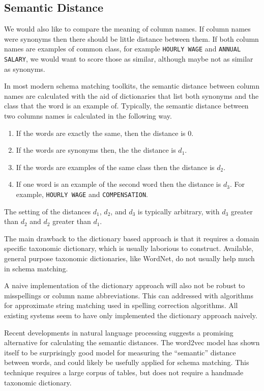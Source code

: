 \documentclass{datamade}
\theoremstyle{definition}
\theoremstyle{remark}
\begin{document}
\subsection{Semantic Distance}
We would also like to compare the meaning of column names. If column names
were synonyms then there should be little distance between
them. If both column names are examples of common class, for example
\verb+HOURLY WAGE+ and \verb+ANNUAL SALARY+, we would want to score
those as similar, although maybe not as similar as synonyms.

In most modern schema matching toolkits, the semantic distance between
column names are calculated with the aid of dictionaries that list
both synonyms and the class that the word is an example of. Typically,
the semantic distance between two columns names is calculated in the
following way.

\begin{enumerate}
  \item If the words are exactly the same, then the distance is $0$.
  \item If the words are synonyms then, the the distance is $d_1$.
  \item If the words are examples of the same class then the distance
    is $d_2$.
  \item If one word is an example of the second word then the distance
    is $d_3$. For example, \verb+HOURLY WAGE+ and \verb+COMPENSATION+.
\end {enumerate}

The setting of the distances $d_1$, $d_2$, and $d_3$ is typically
arbitrary, with $d_3$ greater than $d_2$ and $d_2$ greater than $d_1$.

The main drawback to the dictionary based approach is that it requires
a domain specific taxonomic dictionary, which is usually laborious to
construct. Available, general purpose taxonomic dictionaries, like
WordNet, do not usually help much in schema matching.

A naive implementation of the dictionary approach will also not be
robust to misspellings or column name abbreviations. This can
addressed with algorithms for approximate string matching used in
spelling correction algorithms. All existing systems seem to have only
implemented the dictionary approach naively.

Recent developments in natural language processing suggests a
promising alternative for calculating the semantic distances. The
word2vec model has shown itself to be surprisingly good model for
measuring the ``semantic'' distance between words, and could likely be
usefully applied for schema matching. This technique requires a large
corpus of tables, but does not require a handmade taxonomic
dictionary.\cite{http://radimrehurek.com/gensim/models/word2vec.html}
\end{document}
